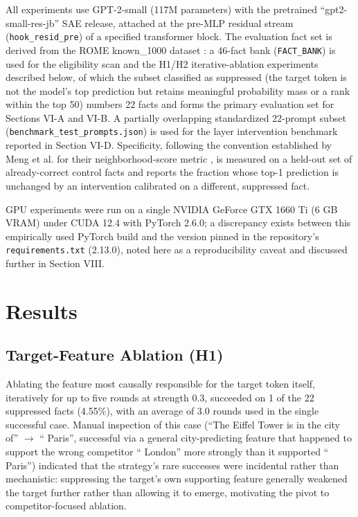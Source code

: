 \documentclass[conference]{IEEEtran}
\begin{document}
All experiments use GPT-2-small (117M parameters) with the pretrained ``gpt2-small-res-jb'' SAE release, attached at the pre-MLP residual stream (\texttt{hook\_resid\_pre}) of a specified transformer block. The evaluation fact set is derived from the ROME known\_1000 dataset \cite{meng2022rome}: a 46-fact bank (\texttt{FACT\_BANK}) is used for the eligibility scan and the H1/H2 iterative-ablation experiments described below, of which the subset classified as suppressed (the target token is not the model's top prediction but retains meaningful probability mass or a rank within the top 50) numbers 22 facts and forms the primary evaluation set for Sections VI-A and VI-B. A partially overlapping standardized 22-prompt subset (\texttt{benchmark\_test\_prompts.json}) is used for the layer intervention benchmark reported in Section VI-D. Specificity, following the convention established by Meng et al. for their neighborhood-score metric \cite{meng2022rome}, is measured on a held-out set of already-correct control facts and reports the fraction whose top-1 prediction is unchanged by an intervention calibrated on a different, suppressed fact.

GPU experiments were run on a single NVIDIA GeForce GTX 1660 Ti (6 GB VRAM) under CUDA 12.4 with PyTorch 2.6.0; a discrepancy exists between this empirically used PyTorch build and the version pinned in the repository's \texttt{requirements.txt} (2.13.0), noted here as a reproducibility caveat and discussed further in Section VIII.

\section{Results}

\subsection{Target-Feature Ablation (H1)}

Ablating the feature most causally responsible for the target token itself, iteratively for up to five rounds at strength 0.3, succeeded on 1 of the 22 suppressed facts (4.55\%), with an average of 3.0 rounds used in the single successful case. Manual inspection of this case (``The Eiffel Tower is in the city of'' $\rightarrow$ `` Paris'', successful via a general city-predicting feature that happened to support the wrong competitor `` London'' more strongly than it supported `` Paris'') indicated that the strategy's rare successes were incidental rather than mechanistic: suppressing the target's own supporting feature generally weakened the target further rather than allowing it to emerge, motivating the pivot to competitor-focused ablation.
\end{document}
